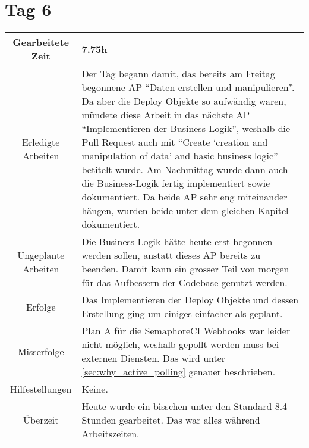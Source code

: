 \section{Tag 6}
\begin{tabularx}{\textwidth}[H]{|c|X|}
  \hline
  Gearbeitete Zeit & 7.75h \\ \hline
  Erledigte Arbeiten & Der Tag begann damit, das bereits am Freitag begonnene AP \enquote{Daten erstellen und
  manipulieren}. Da aber die Deploy Objekte so aufwändig waren, mündete diese Arbeit in das nächste AP
  \enquote{Implementieren der Business Logik}, weshalb die Pull Request auch mit \enquote{Create \enquote{creation
  and manipulation of data} and basic business logic} betitelt wurde. Am Nachmittag wurde dann auch die Business-Logik
  fertig implementiert sowie dokumentiert. Da beide AP sehr eng miteinander hängen, wurden beide unter dem gleichen
  Kapitel dokumentiert. \\ \hline
  Ungeplante Arbeiten & Die Business Logik hätte heute erst begonnen werden sollen, anstatt dieses AP bereits zu
  beenden. Damit kann ein grosser Teil von morgen für das Aufbessern der Codebase genutzt werden. \\ \hline
  Erfolge & Das Implementieren der Deploy Objekte und dessen Erstellung ging um einiges einfacher als geplant. \\ \hline
  Misserfolge & Plan A für die SemaphoreCI Webhooks war leider nicht möglich, weshalb gepollt werden muss bei externen
  Diensten. Das wird unter \ref{sec:why_active_polling} genauer beschrieben. \\ \hline
  Hilfestellungen & Keine. \\ \hline
  Überzeit & Heute wurde ein bisschen unter den Standard 8.4 Stunden gearbeitet. Das war alles während
  Arbeitszeiten. \\ \hline
\end{tabularx}

\newpage

